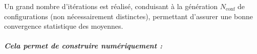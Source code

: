 \medskip

Un grand nombre d’itérations est réalisé, conduisant à la génération \( N_{\text{conf}} \) de configurations (non nécessairement distinctes), permettant d’assurer une bonne convergence statistique des moyennes.

\medskip


\subparagraph{Cela permet de construire numériquement :}

%

